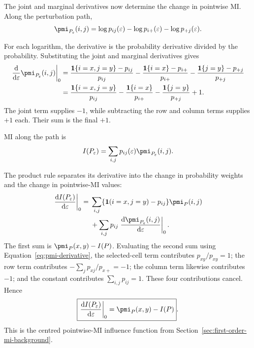 The joint and marginal derivatives now determine the change in
pointwise MI. Along the perturbation path,
\begin{equation}
  \pmi_{P_\varepsilon}(i,j)
  =\log p_{ij}(\varepsilon)
  -\log p_{i+}(\varepsilon)
  -\log p_{+j}(\varepsilon).
\end{equation}
\begin{samepage}%
For each logarithm, the derivative is the probability derivative divided by
the probability. Substituting the joint and marginal derivatives gives
\begin{align}
  \left.
  \frac{\mathrm d}{\mathrm d\varepsilon}
  \pmi_{P_\varepsilon}(i,j)
  \right|_{0}
  &={}
  \frac{\mathbf 1\{i=x,j=y\}-p_{ij}}{p_{ij}}
  -\frac{\mathbf 1\{i=x\}-p_{i+}}{p_{i+}}
  -\frac{\mathbf 1\{j=y\}-p_{+j}}{p_{+j}}
  \notag\\*
  &={}
  \frac{\mathbf 1\{i=x,j=y\}}{p_{ij}}
  -\frac{\mathbf 1\{i=x\}}{p_{i+}}
  -\frac{\mathbf 1\{j=y\}}{p_{+j}}
  +1.
  \label{eq:pmi-derivative}
\end{align}
The joint term supplies \(-1\), while subtracting the row and column
terms supplies \(+1\) each. Their sum is the final \(+1\).
\par
\end{samepage}

MI along the path is
\begin{equation}
  I(P_\varepsilon)
  =\sum_{i,j}p_{ij}(\varepsilon)
  \pmi_{P_\varepsilon}(i,j).
\end{equation}

The product rule separates its derivative into the change in probability
weights and the change in pointwise-MI values:
\begin{align}
  \left.\frac{\mathrm d I(P_\varepsilon)}{\mathrm d\varepsilon}
  \right|_{0}
  ={}&
  \sum_{i,j}
  \{\mathbf 1(i=x,j=y)-p_{ij}\}\pmi_P(i,j)
  \notag\\
  &+
  \sum_{i,j}p_{ij}
  \left.\frac{\mathrm d\pmi_{P_\varepsilon}(i,j)}
  {\mathrm d\varepsilon}\right|_{0}.
\end{align}
The first sum is \(\pmi_P(x,y)-I(P)\). Evaluating the second sum using
Equation~\eqref{eq:pmi-derivative}, the selected-cell term contributes
\(p_{xy}/p_{xy}=1\); the row term contributes
\(-\sum_j p_{xj}/p_{x+}=-1\); the column term likewise contributes \(-1\);
and the constant contributes \(\sum_{i,j}p_{ij}=1\). These four
contributions cancel. Hence
\begin{equation}
  \boxed{
  \left.\frac{\mathrm d I(P_\varepsilon)}{\mathrm d\varepsilon}
  \right|_{0}
  =\pmi_P(x,y)-I(P)
  }.
  \label{eq:mi-derivative}
\end{equation}
This is the centred pointwise-MI influence function from
Section~\ref{sec:first-order-mi-background}.

